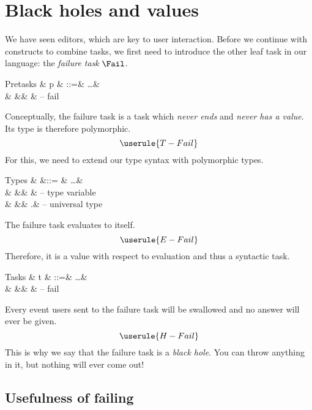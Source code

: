
\section{Black holes and values}

We have seen editors,
which are key to user interaction.
Before we continue with constructs to combine tasks,
we first need to introduce the other leaf task in our language:
the \emph{failure task} $\Fail$.

\begin{grammar}
  Pretasks
    & p & ::=& \ldots & \\
    &   &\mid& \Fail  & – fail \\
\end{grammar}
Conceptually,
the failure task is a task which \emph{never ends} and \emph{never has a value}.
Its type is therefore polymorphic.
\begin{equation*}
  \userule{T-Fail}
\end{equation*}
For this,
we need to extend our type syntax with polymorphic types.
\begin{grammar}
  Types
    & \tau &::= & \ldots             & \\
    &      &\mid& \alpha             & – type variable \\
    &      &\mid& \forall\alpha.\tau & – universal type \\
\end{grammar}

The failure task evaluates to itself.
\begin{equation*}
  \userule{E-Fail}
\end{equation*}
Therefore,
it is a value with respect to evaluation and thus a syntactic task.
\begin{grammar}
  Tasks
    & t & ::=& \ldots & \\
    &   &\mid& \Fail  & – fail \\
\end{grammar}

Every event users sent to the failure task will be swallowed
and no answer will ever be given.
\begin{equation*}
  \userule{H-Fail}
\end{equation*}
This is why we say that the failure task is a \emph{black hole}.
You can throw anything in it,
but nothing will ever come out!


\subsection{Usefulness of failing}
\label{sec:succeeding}

